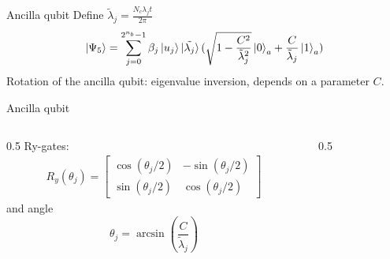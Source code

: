\begin{frame}{Ancilla qubit}
    Define $\tilde{\lambda}_j = \frac{N_c\lambda_j t}{2\pi}$
    \begin{equation*}
        \ket{\Psi_5} = \sum_{j=0}^{2^{n_b}-1} \beta_j\ket{u_j}\ket{\tilde{\lambda_j}}(\sqrt{1-\frac{C^2}{\tilde{\lambda}_j^2}}\ket{0}_a + \frac{C}{\tilde{\lambda}_j}\ket{1}_a)
    \end{equation*}
    Rotation of the ancilla qubit: eigenvalue inversion, depends on a parameter $C$. 
\end{frame}

\begin{frame}{Ancilla qubit}
    \begin{columns}
    \begin{column}{0.5\textwidth}
        Ry-gates: 
        \begin{align*}
            R_y(\theta_j) =
            \begin{bmatrix}
                \cos(\theta_j/2) & -\sin(\theta_j/2) \\
                \sin(\theta_j/2) & \cos(\theta_j/2)
            \end{bmatrix} 
        \end{align*}
        and angle 
        \begin{equation*}
            \theta_j = \arcsin(\frac{C}{\tilde{\lambda}_j})
        \end{equation*}
    \end{column}
    \begin{column}{0.5\textwidth}
        \begin{center}
\end{center}
\end{column}
\end{columns}
\end{frame}
